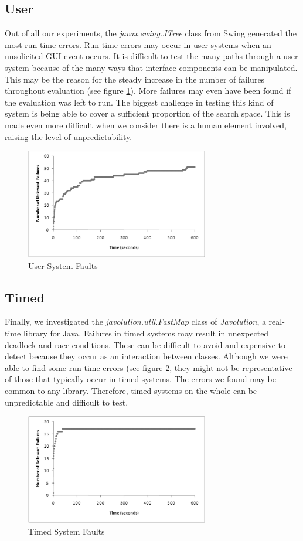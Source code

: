 \documentclass[runningheads,a4paper]{llncs}
\begin{document}
\subsection*{User}
Out of all our experiments, the \emph{javax.swing.JTree} class from Swing generated the most run-time errors. Run-time errors may occur in user systems when an unsolicited GUI event occurs. It is difficult to test the many paths through a user system because of the many ways that interface components can be manipulated. This may be the reason for the steady increase in the number of failures throughout evaluation (see figure \ref{user}). More failures may even have been found if the evaluation was left to run. The biggest challenge in testing this kind of system is being able to cover a sufficient proportion of the search space. This is made even more difficult when we consider there is a human element involved, raising the level of unpredictability.
\begin{figure}[!h]
\centering
\includegraphics[width=80mm]{figures/user.eps}
\caption{User System Faults}
\label{user}
\end{figure}


\subsection*{Timed}
Finally, we investigated the \emph{javolution.util.FastMap} class of \emph{Javolution}, a real-time library for Java. Failures in timed systems may result in unexpected deadlock and race conditions. These can be difficult to avoid and expensive to detect because they occur as an interaction between classes. Although we were able to find some run-time errors (see figure \ref{timed}, they might not be representative of those that typically occur in timed systems. The errors we found may be common to any library. Therefore, timed systems on the whole can be unpredictable and difficult to test.

\begin{figure}[!h]
\centering
\includegraphics[width=80mm]{figures/timed.eps}
\caption{Timed System Faults}
\label{timed}
\end{figure}
\end{document}
